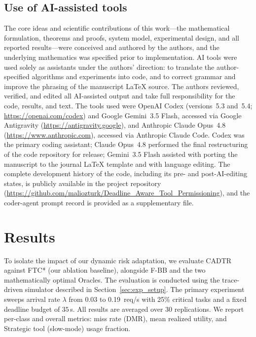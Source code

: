 \documentclass[fleqn,12pt,lineno]{wlpeerj}
\begin{document}
\subsection{Use of AI-assisted tools}
\label{sec:ai_tools}
The core ideas and scientific contributions of this work---the
mathematical formulation, theorems and proofs, system model, experimental
design, and all reported results---were conceived and authored by the
authors, and the underlying mathematics was specified prior to
implementation. AI
tools were used solely as assistants under the authors' direction: to
translate the author-specified algorithms and experiments into code, and
to correct grammar and improve the phrasing of the manuscript
\LaTeX{} source. The authors reviewed, verified, and edited all
AI-assisted output and take full responsibility for the code, results,
and text. The tools used were OpenAI Codex (versions~5.3 and~5.4;
\url{https://openai.com/codex}) and Google Gemini~3.5 Flash, accessed
via Google Antigravity (\url{https://antigravity.google}), and
Anthropic Claude Opus~4.8 (\url{https://www.anthropic.com}), accessed
via Anthropic Claude Code. Codex was the primary coding assistant;
Claude Opus~4.8 performed the final restructuring of the code
repository for release; Gemini~3.5 Flash assisted with porting the
manuscript to the journal \LaTeX{} template and with language editing.
The complete development history of the code, including its pre- and
post-AI-editing states, is publicly available in the project repository
(\url{https://github.com/maliozturk/Deadline_Aware_Tool_Permissioning}),
and the coder-agent prompt record is provided as a supplementary file.






\section{Results}
\label{sec:results}

To isolate the impact of our dynamic risk adaptation, we evaluate CADTR against FTC* (our ablation baseline), alongside F-BB and the two mathematically optimal Oracles. The evaluation is conducted using the trace-driven simulator described in Section~\ref{sec:exp_setup}. The primary experiment sweeps arrival rate $\lambda$ from 0.03 to 0.19~req/s with 25\% critical tasks and a fixed deadline budget of $35$\,s. All results are averaged over 30 replications. We report per-class and overall metrics: miss rate (DMR), mean realized utility, and Strategic tool (slow-mode) usage fraction.
\end{document}
